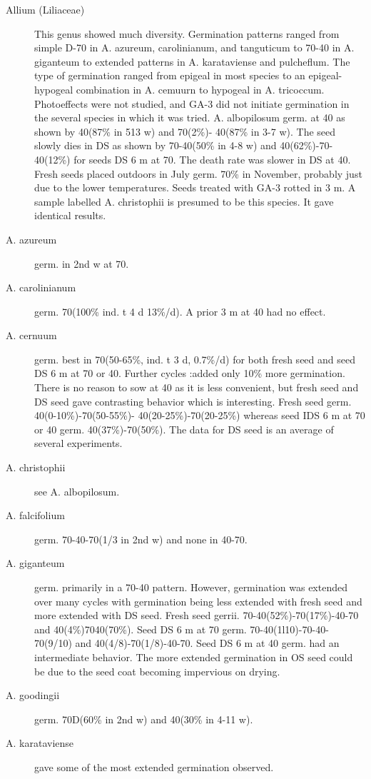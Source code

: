 \begin{description}
\item[Allium (Liliaceae)] This genus showed much diversity. Germination patterns
ranged from simple D-70 in A. azureum, carolinianum, and tanguticum to 70-40 in A.
giganteum to extended patterns in A. karataviense and pulcheflum. The type of
germination ranged from epigeal in most species to an epigeal-hypogeal combination
in A. cemuurn to hypogeal in A. tricoccum. Photoeffects were not studied, and GA-3
did not initiate germination in the several species in which it was tried.
A. albopilosum germ. at 40 as shown by 40(87\% in 513 w) and 70(2\%)-
40(87\% in 3-7 w). The seed slowly dies in DS as shown by 70-40(50\% in 4-8 w) and
40(62\%)-70-40(12\%) for seeds DS 6 m at 70. The death rate was slower in DS at 40.
Fresh seeds placed outdoors in July germ. 70\% in November, probably just due to the
lower temperatures. Seeds treated with GA-3 rotted in 3 m. A sample labelled A.
christophii is presumed to be this species. It gave identical results.
\item[A. azureum] germ. in 2nd w at 70.
\item[A. carolinianum] germ. 70(100\% ind. t 4 d 13\%/d). A prior 3 m at 40 had no
effect.
\item[A. cernuum] germ. best in 70(50-65\%, ind. t 3 d, 0.7\%/d) for both fresh seed and
seed DS 6 m at 70 or 40. Further cycles :added only 10\% more germination. There is
no reason to sow at 40 as it is less convenient, but fresh seed and DS seed gave
contrasting behavior which is interesting. Fresh seed germ. 40(0-10\%)-70(50-55\%)-
40(20-25\%)-70(20-25\%) whereas seed IDS 6 m at 70 or 40 germ. 40(37\%)-70(50\%).
The data for DS seed is an average of several experiments.
\item[A. christophii] see A. albopilosum.
\item[A. falcifolium] germ. 70-40-70(1/3 in 2nd w) and none in 40-70.
\item[A. giganteum] germ. primarily in a 70-40 pattern. However, germination was
extended over many cycles with germination being less extended with fresh seed and
more extended with DS seed. Fresh seed gerrii. 70-40(52\%)-70(17\%)-40-70 and
40(4\%)7040(70\%). Seed DS 6 m at 70 germ. 70-40(1l10)-70-40-70(9/10) and
40(4/8)-70(1/8)-40-70. Seed DS 6 m at 40 germ. had an intermediate behavior. The
more extended germination in OS seed could be due to the seed coat becoming
impervious on drying.
\item[A. goodingii] germ. 70D(60\% in 2nd w) and 40(30\% in 4-11 w).
\item[A. karataviense] gave some of the most extended germination observed.

\end{description}
